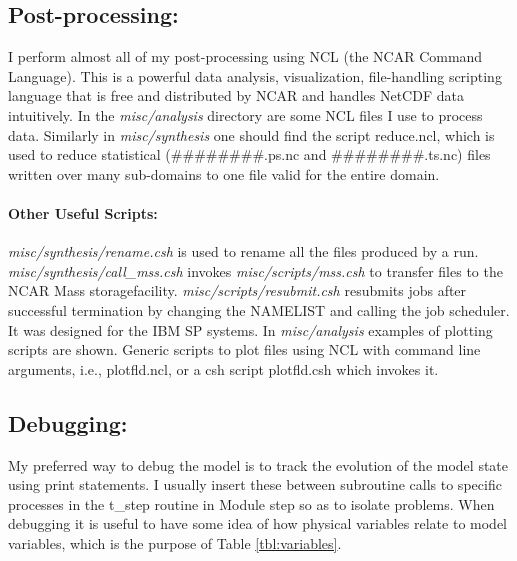 \documentclass[11pt,a4paper]{article}
\begin{document}
\subsection{Post-processing:}

I perform almost all of my post-processing using NCL (the NCAR Command
Language). This is a powerful data analysis, visualization,
file-handling scripting language that is free and distributed by NCAR
and handles NetCDF data intuitively.  In the \emph{misc/analysis}
directory are some NCL files I use to process data.  Similarly in
\emph{misc/synthesis} one should find the script reduce.ncl, which is
used to reduce statistical (\#\#\#\#\#\#\#\#.ps.nc and \#\#\#\#\#\#\#\#.ts.nc)
files written over many sub-domains to one file valid for the entire domain.

\paragraph{Other Useful Scripts:} \emph{misc/synthesis/rename.csh} 
is used to rename all the files produced by a run. 
\emph{misc/synthesis/call\_mss.csh} invokes \emph{misc/scripts/mss.csh} 
to transfer files to the NCAR Mass storagefacility.  
\emph{misc/scripts/resubmit.csh} resubmits jobs after
successful termination by changing the NAMELIST and calling the job
scheduler. It was designed for the IBM SP systems. In
\emph{misc/analysis} examples of plotting scripts are shown.
Generic scripts to plot files using NCL with command line arguments, i.e.,
plotfld.ncl, or a csh script plotfld.csh which invokes it.

\subsection{Debugging:}

My preferred way to debug the model is to track the evolution of the
model state using print statements.  I usually insert these between
subroutine calls to specific processes in the t\_step routine in
Module step so as to isolate problems.  When debugging it is useful to
have some idea of how physical variables relate to model variables,
which is the purpose of Table \ref{tbl:variables}.
\end{document}
